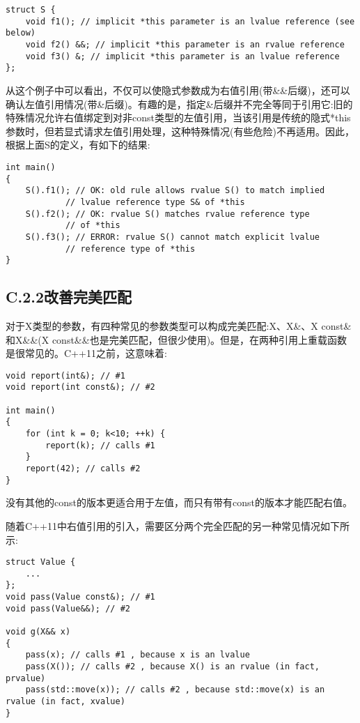 \begin{lstlisting}[style=styleCXX]
struct S {
	void f1(); // implicit *this parameter is an lvalue reference (see below)
	void f2() &&; // implicit *this parameter is an rvalue reference
	void f3() &; // implicit *this parameter is an lvalue reference
};
\end{lstlisting}

从这个例子中可以看出，不仅可以使隐式参数成为右值引用(带\&\&后缀)，还可以确认左值引用情况(带\&后缀)。有趣的是，指定\&后缀并不完全等同于引用它:旧的特殊情况允许右值绑定到对非const类型的左值引用，当该引用是传统的隐式*this参数时，但若显式请求左值引用处理，这种特殊情况(有些危险)不再适用。因此，根据上面S的定义，有如下的结果:

\begin{lstlisting}[style=styleCXX]
int main()
{
	S().f1(); // OK: old rule allows rvalue S() to match implied
			// lvalue reference type S& of *this
	S().f2(); // OK: rvalue S() matches rvalue reference type
			// of *this
	S().f3(); // ERROR: rvalue S() cannot match explicit lvalue
			// reference type of *this
}
\end{lstlisting}


\subsection{C.2.2\hspace{0.2cm}改善完美匹配}

对于X类型的参数，有四种常见的参数类型可以构成完美匹配:X、X\&、X const\&和X\&\&(X const\&\&也是完美匹配，但很少使用)。但是，在两种引用上重载函数是很常见的。C++11之前，这意味着:

\begin{lstlisting}[style=styleCXX]
void report(int&); // #1
void report(int const&); // #2

int main()
{
	for (int k = 0; k<10; ++k) {
		report(k); // calls #1
	}
	report(42); // calls #2
}
\end{lstlisting}

没有其他的const的版本更适合用于左值，而只有带有const的版本才能匹配右值。

随着C++11中右值引用的引入，需要区分两个完全匹配的另一种常见情况如下所示:

\begin{lstlisting}[style=styleCXX]
struct Value {
	...
};
void pass(Value const&); // #1
void pass(Value&&); // #2

void g(X&& x)
{
	pass(x); // calls #1 , because x is an lvalue
	pass(X()); // calls #2 , because X() is an rvalue (in fact, prvalue)
	pass(std::move(x)); // calls #2 , because std::move(x) is an rvalue (in fact, xvalue)
}
\end{lstlisting}

